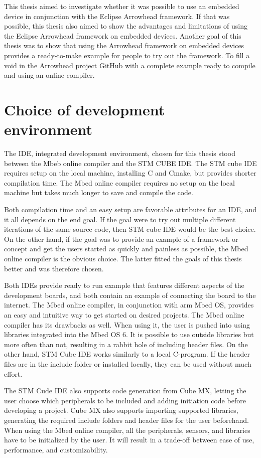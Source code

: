 This thesis aimed to investigate whether it was possible to use an embedded device in conjunction with the Eclipse Arrowhead framework.
If that was possible, this thesis also aimed to show the advantages and limitations of using the Eclipse Arrowhead framework on embedded devices.
Another goal of this thesis was to show that using the Arrowhead framework on embedded devices provides a ready-to-make example for people to try out the framework.
To fill a void in the Arrowhead project GitHub with a complete example ready to compile and using an online compiler.

\section{Choice of development environment}
The IDE, integrated development environment, chosen for this thesis stood between the Mbeb online compiler and the STM CUBE IDE. 
The STM cube IDE requires setup on the local machine, installing C and Cmake, but provides shorter compilation time.
The Mbed online compiler requires no setup on the local machine but takes much longer to save and compile the code.

Both compilation time and an easy setup are favorable attributes for an IDE, and it all depends on the end goal.
If the goal were to try out multiple different iterations of the same source code, then STM cube IDE would be the best choice.
On the other hand, if the goal was to provide an example of a framework or concept and get the users started as quickly and painless as possible, the Mbed online compiler is the obvious choice.
The latter fitted the goals of this thesis better and was therefore chosen. 

Both IDEs provide ready to run example that features different aspects of the development boards, and both contain an example of connecting the board to the internet.
The Mbed online compiler, in conjunction with arm Mbed OS, provides an easy and intuitive way to get started on desired projects.
The Mbed online compiler has its drawbacks as well. 
When using it, the user is pushed into using libraries integrated into the Mbed OS 6.
It is possible to use outside libraries but more often than not, resulting in a rabbit hole of including header files.
On the other hand, STM Cube IDE works similarly to a local C-program. 
If the header files are in the include folder or installed locally, they can be used without much effort.

The STM Cude IDE also supports code generation from Cube MX, letting the user choose which peripherals to be included and adding initiation code before developing a project.
Cube MX also supports importing supported libraries, generating the required include folders and header files for the user beforehand. 
When using the Mbed online compiler, all the peripherals, sensors, and libraries have to be initialized by the user.
It will result in a trade-off between ease of use, performance, and customizability.

